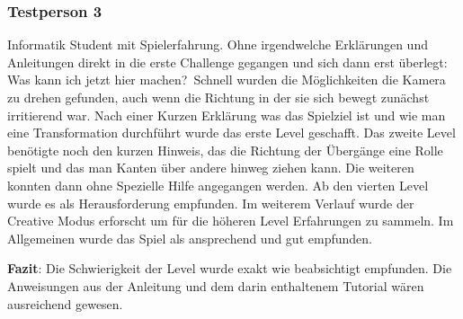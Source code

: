 \subsubsection*{Testperson 3}

Informatik Student mit Spielerfahrung. Ohne irgendwelche Erklärungen und Anleitungen direkt in die erste Challenge gegangen und sich dann erst überlegt: \glqq Was kann ich jetzt hier machen?\grqq~Schnell wurden die Möglichkeiten die Kamera zu drehen gefunden, auch wenn die Richtung in der sie sich bewegt zunächst irritierend war. Nach einer Kurzen Erklärung was das Spielziel ist und wie man eine Transformation durchführt wurde das erste Level geschafft. Das zweite Level benötigte noch den kurzen Hinweis, das die Richtung der Übergänge eine Rolle spielt und das man Kanten über andere hinweg ziehen kann. Die weiteren konnten dann ohne Spezielle Hilfe angegangen werden. Ab den vierten Level wurde es als Herausforderung empfunden. Im weiterem Verlauf wurde der Creative Modus erforscht um für die höheren Level Erfahrungen zu sammeln. Im Allgemeinen wurde das Spiel als ansprechend und gut empfunden.

{\bf Fazit}: Die Schwierigkeit der Level wurde exakt wie beabsichtigt empfunden. Die Anweisungen aus der Anleitung und dem darin enthaltenem Tutorial wären ausreichend gewesen.




